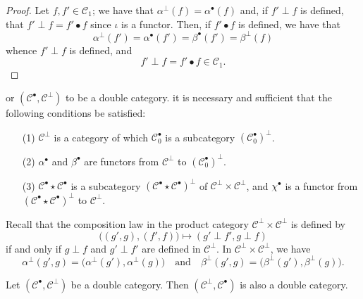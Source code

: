 \documentclass[a4paper,fleqn]{article}
\theoremstyle{plain}
\newenvironment{theorem}[1]
  {\renewcommand\theinnertheorem{#1}\innertheorem}
  {\endinnertheorem}
\newenvironment{corollary}[1]
  {\renewcommand\theinnercorollary{#1}\innercorollary}
  {\endinnercorollary}
\theoremstyle{definition}
\newcommand{\oldpage}[1]{{\marginpar{\footnotesize$\bigg\vert$\,\,\,\,\textit{p.~#1}}}}
\newcommand{\textand}{\quad\text{and}\quad}
\newcommand{\CC}{\mathcal{C}}
\begin{document}
\begin{proof}
  Let $f,f'\in\CC_1$;
  we have that $\alpha^\perp(f)=\alpha^\bullet(f)$ and, if $f'\perp f$ is defined, that $f'\perp f=f'\bullet f$ since $\iota$ is a functor.
  Then, if $f'\bullet f$ is defined, we have that
  \[
    \alpha^\perp(f')
    = \alpha^\bullet(f')
    = \beta^\bullet(f')
    = \beta^\perp(f)
  \]
  whence $f'\perp f$ is defined, and
  \[
    f'\perp f
    = f'\bullet f
    \in\CC_1.
  \]
\end{proof}

\begin{corollary}
  For $(\CC^\bullet,\CC^\perp)$ to be a double category. it is necessary and sufficient that the following conditions be satisfied:
  \begin{enumerate}
    \item[\normalfont(1)]
      $\CC^\perp$ is a category of which $\CC_0^\bullet$ is a subcategory $(\CC_0^\bullet)^\perp$.
    \item[\normalfont(2)]
      $\alpha^\bullet$ and $\beta^\bullet$ are functors from $\CC^\perp$ to $(\CC_0^\bullet)^\perp$.
    \item[\normalfont(3)]
      $\CC^\bullet\star\CC^\bullet$ is a subcategory $(\CC^\bullet\star\CC^\bullet)^\perp$ of $\CC^\perp\times\CC^\perp$, and $\chi^\bullet$ is a functor from $(\CC^\bullet\star\CC^\bullet)^\perp$ to $\CC^\perp$.
  \end{enumerate}
\end{corollary}

Recall that the composition law in the product category $\CC^\perp\times\CC^\perp$ is defined by
\[
  \big(
    (g',g), (f',f)
  \big)
  \longmapsto (g'\perp f',g\perp f)
\]
if and only if $g\perp f$ and $g'\perp f'$ are defined in $\CC^\perp$.
In $\CC^\perp\times\CC^\perp$, we have
\[
  \alpha^\perp(g',g)
  =\big(
    \alpha^\perp(g'), \alpha^\perp(g)
  \big)
  \textand
  \beta^\perp(g',g)
  =\big(
    \beta^\perp(g'), \beta^\perp(g)
  \big).
\]

\oldpage{390}

\begin{theorem}{4}
\label{theorem:ii-4}
  Let $(\CC^\bullet,\CC^\perp)$ be a double category.
  Then $(\CC^\perp,\CC^\bullet)$ is also a double category.
\end{theorem}
\end{document}
